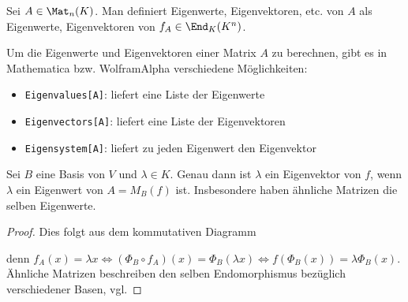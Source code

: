 \begin{definition}
	Sei $A\in\Mat_n(K)$. Man definiert Eigenwerte, Eigenvektoren, etc. von $A$ als Eigenwerte, Eigenvektoren von $f_A\in\End_K(K^n)$.
\end{definition}

\begin{mathematica}
	Um die Eigenwerte und Eigenvektoren einer Matrix $A$ zu berechnen, gibt es in Mathematica bzw. WolframAlpha verschiedene Möglichkeiten:
	\begin{itemize}
		\item \texttt{Eigenvalues[A]}: liefert eine Liste der Eigenwerte
		\item \texttt{Eigenvectors[A]}: liefert eine Liste der Eigenvektoren
		\item \texttt{Eigensystem[A]}: liefert zu jeden Eigenwert den Eigenvektor
	\end{itemize}
\end{mathematica}

\begin{proposition}
	Sei $B$ eine Basis von $V$ und $\lambda\in K$. Genau dann ist $\lambda$ ein Eigenvektor von $f$, wenn $\lambda$ ein Eigenwert von $A=M_B(f)$ ist. Insbesondere haben ähnliche Matrizen die selben Eigenwerte.
\end{proposition}
\begin{proof}
	Dies folgt aus dem kommutativen Diagramm
	\begin{center}\end{center}
	denn $f_A(x)=\lambda x\iff (\Phi_B\circ f_A)(x)=\Phi_B(\lambda x)\iff f(\Phi_B(x))=\lambda\Phi_B(x)$. \\
	Ähnliche Matrizen beschreiben den selben Endomorphismus bezüglich verschiedener Basen, vgl. 
\end{proof}